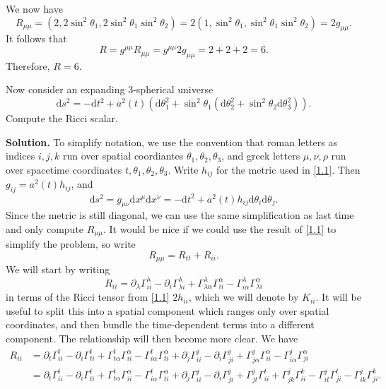 \documentclass[11pt, letterpaper]{article}
\begin{document}
We now have
\[
	R_{\mu \mu } = \left( 2, 2 \sin ^2\theta _1, 2 \sin ^2\theta _1 \sin ^2\theta _2 \right) =2\left( 1, \sin ^2\theta _1, \sin ^2\theta _1 \sin ^2\theta _2 \right) =2g_{\mu \mu } 
.\]
It follows that
\[
	R = g^{\mu \mu } R_{\mu \mu } =g^{\mu \mu } 2g_{\mu \mu } =2 + 2 + 2 = 6
.\]
Therefore, $R=6$.

\begin{problem}
	Now consider an expanding 3-spherical universe
	\[
		\mathrm{d} s^2 = - \mathrm{d} t^2 + a^2(t) \left( \mathrm{d} \theta _1^2 + \sin ^2\theta _1  \left( \mathrm{d} \theta _2^2 + \sin ^2\theta _2 \mathrm{d} \theta _3^2 \right) \right) 
	.\]
	Compute the Ricci scalar.
\end{problem}
\noindent \textbf{Solution.} To simplify notation, we use the convention that roman letters as indices $i,j,k$ run over spatial coordiantes $\theta _1,\theta _2,\theta _3$, and greek letters $\mu ,\nu ,\rho $ run over spacetime coordinates $t,\theta _1,\theta _2,\theta _3$. Write $h_{ij} $ for the metric used in \cref{1.1}. Then $g_{ij} =a^2(t) h_{ij} $, and
\[
	\mathrm{d} s^2 = g_{\mu \nu } \mathrm{d} x^\mu \mathrm{d} x^\nu =-\mathrm{d} t^2 + a^2(t) h_{ij} \mathrm{d} \theta _i \mathrm{d} \theta _j
.\]
Since the metric is still diagonal, we can use the same simplification as last time and only compute $R_{\mu \mu } $. It would be nice if we could use the result of \cref{1.1} to simplify the problem, so write
\[
	R_{\mu \mu } =R_{tt} +R_{ii} 
.\]
We will start by writing
\[
	R_{ii} =\partial _\lambda \Gamma ^\lambda _{ii} -\partial _i \Gamma ^\lambda _{\lambda i}+\Gamma ^\lambda _{\lambda \alpha } \Gamma ^\alpha _{ii} -\Gamma ^\lambda _{i \alpha } \Gamma ^\alpha _{\lambda i} 
\]
in terms of the Ricci tensor from \cref{1.1} $2h_{ii} $, which we will denote by $K_{ii} $. It will be useful to split this into a spatial component which ranges only over spatial coordinates, and then bundle the time-dependent terms into a different component. The relationship will then become more clear. We have
\begin{align*}
	R_{ii} &=\partial _t\Gamma ^t_{ii} -\partial _i\Gamma ^t_{ti} +\Gamma ^t_{t\alpha } \Gamma ^\alpha _{ii} -\Gamma ^t_{i\alpha } \Gamma ^\alpha _{ti} +\partial _j\Gamma ^j_{ii} -\partial _i\Gamma^j_{ji} +\Gamma ^j_{j\alpha } \Gamma ^\alpha _{ii} -\Gamma ^j_{i\alpha } \Gamma ^\alpha _{ji} \\
	       &=\partial _t\Gamma ^t_{ii} -\partial _i\Gamma ^t_{ti} +\Gamma ^t_{t\alpha } \Gamma ^\alpha _{ii} -\Gamma ^t_{i\alpha } \Gamma ^\alpha _{ti} +\partial _j\Gamma ^j_{ii} -\partial _i\Gamma^j_{ji} +\Gamma ^j_{jt} \Gamma ^t_{ii}+\Gamma ^j_{jk} \Gamma ^k _{ii} -\Gamma ^j_{it} \Gamma ^t_{ji}-\Gamma ^j_{ik} \Gamma ^k_{ji}
.\end{align*}
\end{document}
